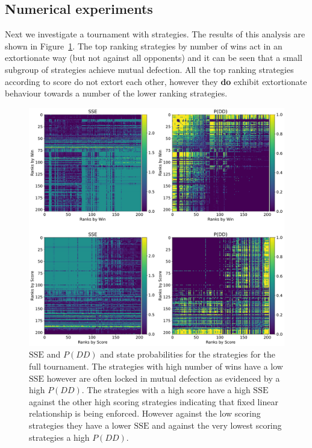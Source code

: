 \documentclass[a4paper]{article}
\newcommand{\SSe}{\text{SSE}}
\begin{document}
\subsection{Numerical experiments}

Next we investigate a tournament with
strategies. The results of
this analysis are shown in Figure~\ref{fig:sse_chi_probabilities_in_full}. The
top ranking strategies by number of wins act in an extortionate way (but not
against all opponents) and it can be seen that a small subgroup of strategies
achieve mutual defection.  All the top ranking strategies according to score
do not extort each other, however they
\textbf{do} exhibit extortionate behaviour towards a number of the lower ranking
strategies.

\begin{figure}[!htbp]
    \centering
    \includegraphics[width=.95\textwidth]{./assets/img/sse_chi_probabilities_in_full/main.pdf}
    \caption{\(\SSe\) and \(P(DD)\) and state probabilities for the strategies for
        the full tournament. The strategies with high number of wins
        have a low \(\SSe\) however are often locked in mutual defection as
        evidenced by a high \(P(DD)\). The strategies with a high score
        have a high \(\SSe\) against the other high scoring strategies
        indicating that fixed linear relationship is being enforced. However
        against the low scoring strategies they have a lower \(\SSe\) and
        against the very lowest scoring strategies a high \(P(DD)\).}
    \label{fig:sse_chi_probabilities_in_full}
\end{figure}
\end{document}
